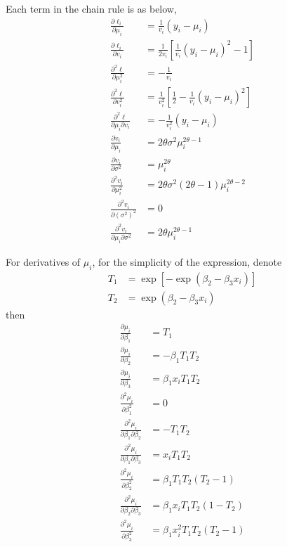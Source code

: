 \documentclass{article}
\begin{document}
\begin{enumerate}[leftmargin = 0 em, label = \arabic*., font = \bfseries]
    Each term in the chain rule is as below,
    \begin{align*}
    \frac{\partial \ell_i}{\partial \mu_i} &= \frac{1}{v_i} (y_i - \mu_i)\\
    \frac{\partial \ell_i}{\partial v_i} &= \frac{1}{2 v_i} \left[ \frac{1}{v_i} (y_i - \mu_i)^2 - 1\right]\\
    \frac{\partial^2 \ell}{\partial \mu_i^2} & = -\frac{1}{v_i}\\
    \frac{\partial^2 \ell}{\partial v_i^2} & = \frac{1}{v_i^2} \left[\frac{1}{2} - \frac{1}{v_i} (y_i - \mu_i)^2\right]\\
    \frac{\partial^2 \ell}{\partial \mu_i \partial v_i} & = -\frac{1}{v_i^2} (y_i - \mu_i)\\
    \frac{\partial v_i}{\partial \mu_i} &= 2 \theta \sigma^2 \mu_i^{2 \theta - 1	}\\
    \frac{\partial v_i}{\partial \sigma^2} & = \mu_i^{2 \theta}\\
    \frac{\partial^2 v_i}{\partial \mu_i^2} & = 2 \theta \sigma^2 (2 \theta - 1) \mu_{i}^{2 \theta - 2}\\
    \frac{\partial^2 v_i}{\partial (\sigma^2)^2} & = 0\\
    \frac{\partial^2 v_i}{\partial \mu_i \partial \sigma^2} & = 2 \theta \mu_i^{2 \theta - 1}
    \end{align*}

    For derivatives of $\mu_i$, for the simplicity of the expression, denote
    \begin{align*}
    T_1 & = \exp[-\exp(\beta_2 - \beta_3 x_i)]\\
    T_2 & = \exp(\beta_2 - \beta_3 x_i)
    \end{align*}
    then
    \begin{align*}
    \frac{\partial \mu_i}{\partial \beta_1} & = T_1\\
    \frac{\partial \mu_i}{\partial \beta_2} & = - \beta_1 T_1 T_2\\
    \frac{\partial \mu_i}{\partial \beta_3} & = \beta_1 x_i T_1 T_2\\
    \frac{\partial^2 \mu_i}{\partial \beta_1^2} &= 0\\
    \frac{\partial^2 \mu_i}{\partial \beta_1 \partial \beta_2} &= - T_1 T_2\\
    \frac{\partial^2 \mu_i}{\partial \beta_1 \partial \beta_3} &= x_i T_1 T_2\\
    \frac{\partial^2 \mu_i}{\partial \beta_2^2} &= \beta_1 T_1 T_2 (T_2 - 1)\\
    \frac{\partial^2 \mu_i}{\partial \beta_2 \partial \beta_3} &= \beta_1 x_i T_1 T_2 (1 -T_2)\\
    \frac{\partial^2 \mu_i}{\partial \beta_3^2} &= \beta_1 x_i^2 T_1 T_2 (T_2 - 1)
    \end{align*}
    

\end{enumerate}
\end{document}
